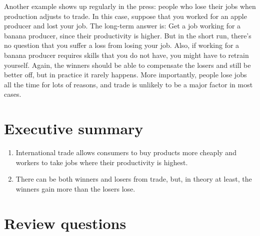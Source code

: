 Another example shows up regularly in the press: people who lose their
jobs when production adjusts to trade.  In this case, suppose that you
worked for an apple producer and lost your job. The long-term
answer is:  Get a job working for a banana producer, since their
productivity is higher. But in the short run, there's no question
that you suffer a loss from losing your job. Also, if working for a
banana producer requires skills that you do not have, you might
have to retrain yourself. Again, the winners should be able to
compensate the losers and still be better off, but in practice it
rarely happens. More importantly, people lose jobs all the time for lots of
reasons, and trade is unlikely to be a major factor in most cases.


\section*{Executive summary}

\setlength{\leftmargini}{0.5\oldleftmargini}
\begin{enumerate}
\item International trade allows consumers to buy products more cheaply
and workers to take jobs where their productivity is highest.

\item There can be both winners and losers from trade,
but, in theory at least, the winners gain more than the losers lose.  
\end{enumerate}
\setlength{\leftmargini}{\oldleftmargini}

\section*{Review questions}


